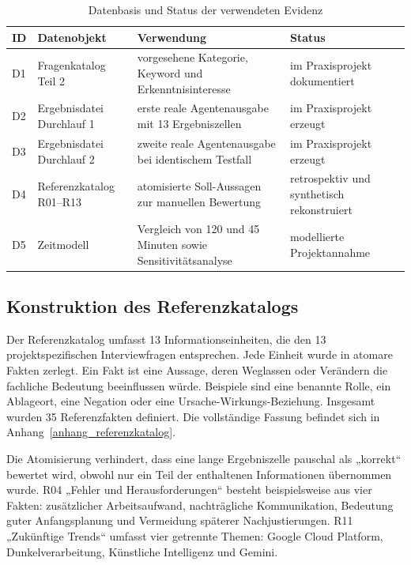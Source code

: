 \documentclass[
  10pt,
  ngerman,
  a4paper,
  toc=graduated,
  numbers=noenddot,
  headings=standardclasses
]{scrartcl}
\begin{document}
\begin{table}[H]
\centering
\small
\begin{tabularx}{\textwidth}{L{1.2cm}L{3.3cm}Y L{3.0cm}}
\toprule
{}
\textbf{ID} & \textbf{Datenobjekt} & \textbf{Verwendung} & \textbf{Status}\\
\midrule
D1 & Fragenkatalog Teil 2 & vorgesehene Kategorie, Keyword und Erkenntnisinteresse & im Praxisprojekt dokumentiert\\
D2 & Ergebnisdatei Durchlauf 1 & erste reale Agentenausgabe mit 13 Ergebniszellen & im Praxisprojekt erzeugt\\
D3 & Ergebnisdatei Durchlauf 2 & zweite reale Agentenausgabe bei identischem Testfall & im Praxisprojekt erzeugt\\
D4 & Referenzkatalog R01--R13 & atomisierte Soll-Aussagen zur manuellen Bewertung & retrospektiv und synthetisch rekonstruiert\\
D5 & Zeitmodell & Vergleich von 120 und 45 Minuten sowie Sensitivitätsanalyse & modellierte Projektannahme\\
\bottomrule
\end{tabularx}
\caption{Datenbasis und Status der verwendeten Evidenz}
\label{tab:evidenzkette}
\end{table}

\subsection{Konstruktion des Referenzkatalogs}

Der Referenzkatalog umfasst 13 Informationseinheiten, die den 13 projektspezifischen Interviewfragen entsprechen. Jede Einheit wurde in atomare Fakten zerlegt. Ein Fakt ist eine Aussage, deren Weglassen oder Verändern die fachliche Bedeutung beeinflussen würde. Beispiele sind eine benannte Rolle, ein Ablageort, eine Negation oder eine Ursache-Wirkungs-Beziehung. Insgesamt wurden 35 Referenzfakten definiert. Die vollständige Fassung befindet sich in Anhang~\ref{anhang_referenzkatalog}.

Die Atomisierung verhindert, dass eine lange Ergebniszelle pauschal als „korrekt“ bewertet wird, obwohl nur ein Teil der enthaltenen Informationen übernommen wurde. R04 „Fehler und Herausforderungen“ besteht beispielsweise aus vier Fakten: zusätzlicher Arbeitsaufwand, nachträgliche Kommunikation, Bedeutung guter Anfangsplanung und Vermeidung späterer Nachjustierungen. R11 „Zukünftige Trends“ umfasst vier getrennte Themen: Google Cloud Platform, Dunkelverarbeitung, Künstliche Intelligenz und Gemini.
\end{document}
